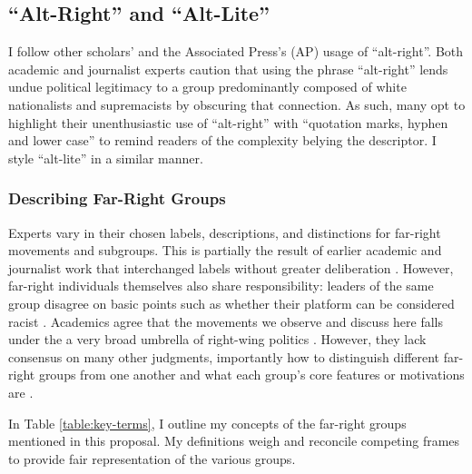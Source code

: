 \documentclass[acmlarge, screen, authorversion]{acmart}
\begin{document}
\subsection{“Alt-Right” and “Alt-Lite”}

I follow other scholars’ \cite{hartzellAltWhiteConceptualizingAltRight, massanariRethinkingResearchEthics2018} and the
Associated Press’s (AP) \cite{johndaniszewskiWritingAltright2016} usage of “alt-right”.
Both academic and journalist experts caution that using the
phrase “alt-right” lends undue political legitimacy to a group predominantly
composed of white nationalists and supremacists by obscuring that
connection. As such, many opt to highlight their unenthusiastic use of
“alt-right” with “quotation marks, hyphen and lower case”
\cite{johndaniszewskiWritingAltright2016} to remind readers of the complexity belying the
descriptor. I style “alt-lite” in a similar manner.

\subsubsection{Describing Far-Right Groups}

Experts vary in their chosen labels, descriptions, and distinctions for far-right movements and
subgroups. This is partially the result of earlier academic and journalist work
that interchanged labels without greater deliberation
\cite{muddeFarRightToday2019}. However,
far-right individuals themselves also share responsibility:
leaders of the same group disagree on basic points
such as whether their platform can be considered racist \cite{muddeFarRightToday2019}.
Academics agree that the movements we observe and discuss here falls under the a very broad umbrella of right-wing politics \cite{muddeFarRightToday2019}. However, they lack consensus on many other judgments, importantly how to distinguish different far-right groups from one another and what each group's core features or motivations are \cite{muddeFarRightToday2019}.

In Table \ref{table:key-terms}, I outline my concepts of the far-right groups mentioned in this proposal. My definitions weigh and reconcile competing frames to provide fair representation of the various groups.
\end{document}
